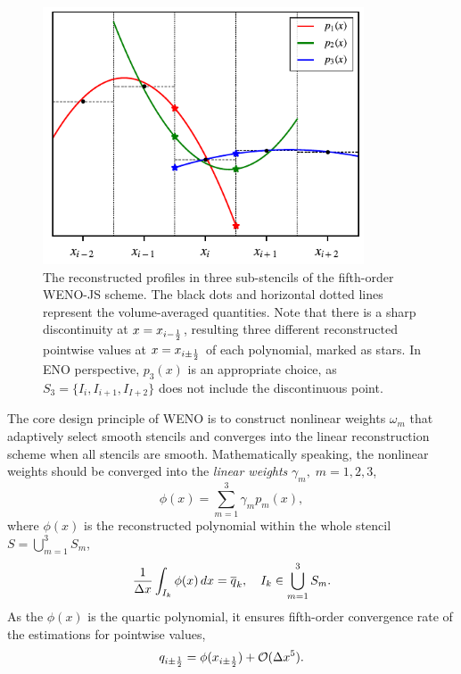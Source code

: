 \begin{figure}
    \centering
    \includegraphics[width=0.85\textwidth]{fig/weno_p1p2p3}
    \caption{The reconstructed profiles in three sub-stencils of the fifth-order WENO-JS scheme.
        The black dots and horizontal dotted lines represent the volume-averaged quantities.
        Note that there is a sharp discontinuity at \( x = x_{{i-\frac{1}{2}}} \),
        resulting three different reconstructed pointwise values at \( x = x_{i \pm \frac{1}{2}} \)
        of each polynomial, marked as stars.
        In ENO perspective, \( p_{3} (x) \) is an appropriate choice, as \( S_{3} = \{ I_{i}, I_{i + 1}, I_{I + 2} \} \)
        does not include the discontinuous point.
    }\label{fig:weno_profiles}
\end{figure}
The core design principle of WENO is to construct nonlinear weights \( \omega_{m} \)
that adaptively select smooth stencils and converges into the linear reconstruction scheme
when all stencils are smooth. Mathematically speaking, the nonlinear weights should
be converged into the \textit{linear weights} \( \gamma_{m}, \; m = 1, 2, 3 \),
\begin{equation}\label{eq:weno_lin_weights}
    \phi (x) = \sum_{m=1}^{3} \gamma_{m} p_{m} (x),
\end{equation}
where \( \phi (x) \) is the reconstructed polynomial within the whole stencil \( S = \bigcup_{m=1}^{3} S_{m} \),
\begin{equation}\label{eq:weno_phi}
    \frac{1}{\Delta x} \int_{I_{k}} \phi (x) \mathop{dx} = \overline{q}_{k}, \quad
        I_{k} \in \bigcup_{m=1}^{3} S_{m}.
\end{equation}
As the \( \phi (x) \) is the quartic polynomial, it ensures fifth-order convergence rate
of the estimations for pointwise values,
\begin{equation}\label{eq:weno_phi_bigo}
    q_{i \pm \frac{1}{2}} = \phi (x_{i \pm \frac{1}{2}}) + \mathcal{O}(\Delta x^{5}).
\end{equation}

